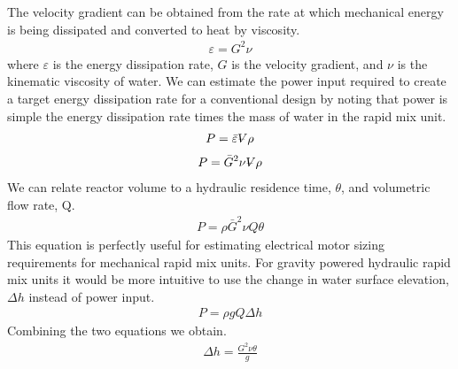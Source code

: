 \documentclass[letterpaper,10pt,english]{sphinxmanual}
\begin{document}
The velocity gradient can be obtained from the rate at which mechanical energy is being dissipated and converted to heat by viscosity.
\begin{equation}\label{equation:Rapid_Mix/RM_Intro:Rapid_Mix/RM_Intro:5}
\begin{split}\varepsilon = G^2 \nu\end{split}
\end{equation}
where \(\varepsilon\) is the energy dissipation rate, \(G\) is the velocity gradient, and \(\nu\) is the kinematic viscosity of water. We can estimate the power input required to create a target energy dissipation rate for a conventional design by noting that power is simple the energy dissipation rate times the mass of water in the rapid mix unit.
\begin{equation}\label{equation:Rapid_Mix/RM_Intro:Rapid_Mix/RM_Intro:6}
\begin{split}P = \bar\varepsilon \rlap{\kern.08em--}V \rho\end{split}
\end{equation}\begin{equation}\label{equation:Rapid_Mix/RM_Intro:Rapid_Mix/RM_Intro:7}
\begin{split}P = \bar G^2 \nu \rlap{\kern.08em--}V \rho\end{split}
\end{equation}
We can relate reactor volume to a hydraulic residence time, \(\theta\), and volumetric flow rate, Q.
\begin{equation}\label{equation:Rapid_Mix/RM_Intro:Rapid_Mix/RM_Intro:8}
\begin{split}P = \rho \bar G^2 \nu Q \theta\end{split}
\end{equation}
This equation is perfectly useful for estimating electrical motor sizing requirements for mechanical rapid mix units. For gravity powered hydraulic rapid mix units it would be more intuitive to use the change in water surface elevation, \(\Delta h\) instead of power input.
\begin{equation}\label{equation:Rapid_Mix/RM_Intro:Rapid_Mix/RM_Intro:9}
\begin{split}P = \rho g Q \Delta h\end{split}
\end{equation}
Combining the two equations we obtain.
\begin{equation}\label{equation:Rapid_Mix/RM_Intro:Rapid_Mix/RM_Intro:10}
\begin{split}\Delta h =   \frac{G^2 \nu \theta}{g}\end{split}
\end{equation}
\end{document}
